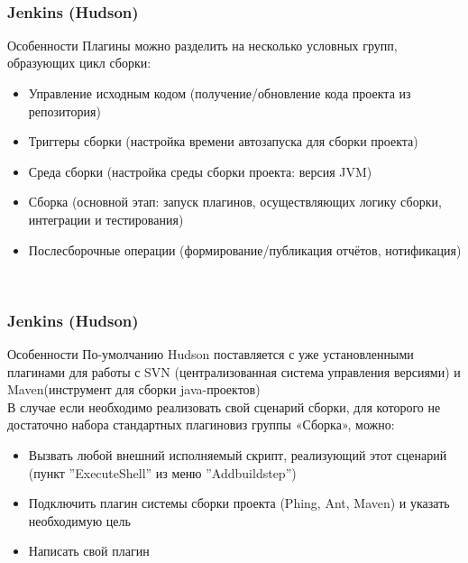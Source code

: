 \documentclass{../industrial-development}
\begin{document}
\lecturenotes
~\cite{Habr_Hudson}

\begin{frame} \frametitle{Jenkins (Hudson)}
	\begin{block}{Особенности}
		Плагины можно разделить на несколько условных групп, образующих цикл сборки:
		\begin{itemize}
			\item Управление исходным кодом (получение/обновление кода проекта из репозитория)
			\item Триггеры сборки (настройка времени автозапуска для сборки проекта)
			\item Среда сборки (настройка среды сборки проекта: версия JVM)
			\item Сборка (основной этап: запуск плагинов, осуществляющих логику сборки, интеграции и тестирования)
			\item Послесборочные операции (формирование/публикация отчётов, нотификация)
		\end{itemize}
	\end{block}


\end{frame}

\lecturenotes
~\cite{Habr_Hudson}

\begin{frame} \frametitle{Jenkins (Hudson)}
	\begin{block}{Особенности}
		По\nobreakdash-умолчанию Hudson поставляется с уже установленными плагинами для работы с SVN (централизованная система управления версиями) и Maven(инструмент для сборки java\nobreakdash-проектов) \\
		В случае если необходимо реализовать свой сценарий сборки, для которого не достаточно набора стандартных плагиновиз группы «Сборка», можно:
		\begin{itemize}
			\item Вызвать любой внешний исполняемый скрипт, реализующий этот сценарий (пункт ”ExecuteShell” из меню ”Addbuildstep”)
			\item Подключить плагин системы сборки проекта (Phing, Ant, Maven) и указать необходимую цель
			\item Написать свой плагин
		\end{itemize}
	\end{block}
\end{frame}

\lecturenotes
~\cite{Habr_Hudson}
\end{document}
